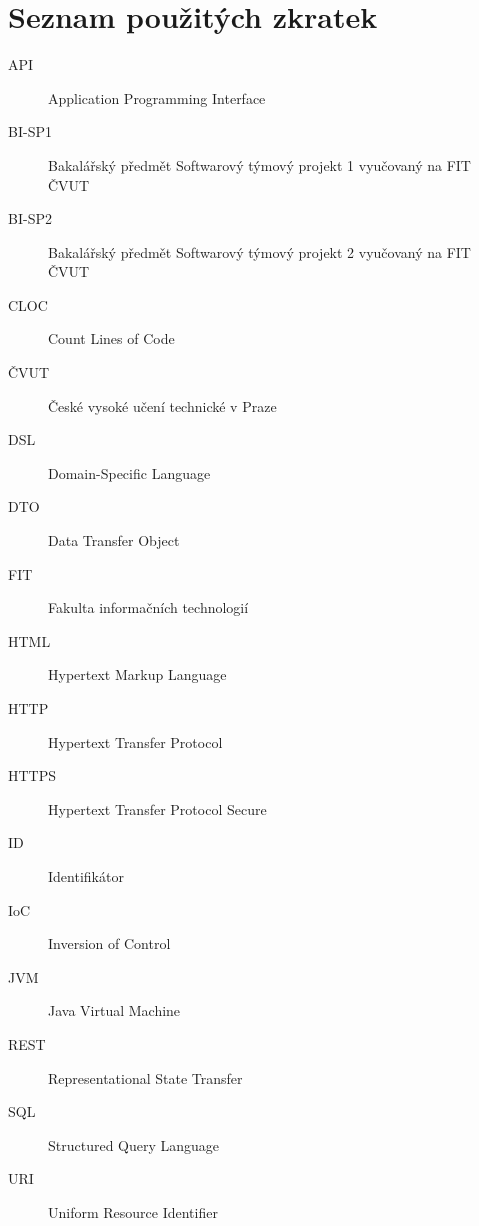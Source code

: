 \chapter{Seznam použitých zkratek}
\begin{description}
    \item[API] Application Programming Interface
    \item[BI-SP1] Bakalářský předmět Softwarový týmový projekt 1 vyučovaný na FIT ČVUT
    \item[BI-SP2] Bakalářský předmět Softwarový týmový projekt 2 vyučovaný na FIT ČVUT
    \item[CLOC] Count Lines of Code
    \item[ČVUT] České vysoké učení technické v Praze
    \item[DSL] Domain-Specific Language
    \item[DTO] Data Transfer Object
    \item[FIT] Fakulta informačních technologií
    \item[HTML] Hypertext Markup Language
    \item[HTTP] Hypertext Transfer Protocol
    \item[HTTPS] Hypertext Transfer Protocol Secure 
    \item[ID] Identifikátor
    \item[IoC] Inversion of Control
    \item[JVM] Java Virtual Machine
    \item[REST] Representational State Transfer
    \item[SQL] Structured Query Language 
    \item[URI] Uniform Resource Identifier
\end{description}